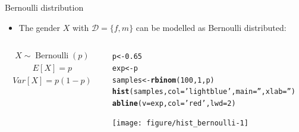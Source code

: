 \documentclass{beamer}\usepackage[]{graphicx}\usepackage[]{color}
\makeatletter
\newcommand{\hlnum}[1]{\textcolor[rgb]{0.686,0.059,0.569}{#1}}%
\newcommand{\hlstr}[1]{\textcolor[rgb]{0.192,0.494,0.8}{#1}}%
\newcommand{\hlstd}[1]{\textcolor[rgb]{0.345,0.345,0.345}{#1}}%
\newcommand{\hlkwb}[1]{\textcolor[rgb]{0.69,0.353,0.396}{#1}}%
\newcommand{\hlkwc}[1]{\textcolor[rgb]{0.333,0.667,0.333}{#1}}%
\newcommand{\hlkwd}[1]{\textcolor[rgb]{0.737,0.353,0.396}{\textbf{#1}}}%
\newenvironment{kframe}{%
 \def\at@end@of@kframe{}%
 \ifinner\ifhmode%
  \def\at@end@of@kframe{\end{minipage}}%
  \begin{minipage}{\columnwidth}%
 \fi\fi%
 \def\FrameCommand##1{\hskip\@totalleftmargin \hskip-\fboxsep
 \colorbox{shadecolor}{##1}\hskip-\fboxsep
     \hskip-\linewidth \hskip-\@totalleftmargin \hskip\columnwidth}%
 \MakeFramed {\advance\hsize-\width
   \@totalleftmargin\z@ \linewidth\hsize
   \@setminipage}}%
 {\par\unskip\endMakeFramed%
 \at@end@of@kframe}
\newenvironment{knitrout}{}{} %
\makeatother
\begin{document}
\begin{frame}[fragile]{Bernoulli distribution}
  \begin{itemize}
    \item The gender $X$ with $\mathcal{D}=\{f, m\}$ can be modelled as
      Bernoulli distributed:
  \end{itemize}
  \begin{columns}
    \begin{column}{.5\linewidth}
      \begin{align*}
        X \sim \operatorname{Bernoulli}(p)
      \end{align*}
      \begin{align*}
        E[X] = p
      \end{align*}
      \begin{align*}
        Var[X] = p(1-p)
      \end{align*}
    \end{column}
    \begin{column}{0.5\linewidth}
\begin{knitrout}\tiny
{}\color{fgcolor}\begin{kframe}
\begin{alltt}
\hlstd{p} \hlkwb{<-} \hlnum{0.65}
\hlstd{exp} \hlkwb{<-} \hlstd{p}
\hlstd{samples} \hlkwb{<-} \hlkwd{rbinom}\hlstd{(}\hlnum{100}\hlstd{,} \hlnum{1}\hlstd{, p)}
\hlkwd{hist}\hlstd{(samples,} \hlkwc{col}\hlstd{=}\hlstr{'lightblue'}\hlstd{,} \hlkwc{main}\hlstd{=}\hlstr{''}\hlstd{,} \hlkwc{xlab}\hlstd{=}\hlstr{''}\hlstd{)}
\hlkwd{abline}\hlstd{(}\hlkwc{v}\hlstd{=exp,} \hlkwc{col}\hlstd{=}\hlstr{'red'}\hlstd{,} \hlkwc{lwd}\hlstd{=}\hlnum{2}\hlstd{)}
\end{alltt}
\end{kframe}

{\centering \texttt{[image: figure/hist\_bernoulli-1]} 

}



\end{knitrout}
    \end{column}
  \end{columns}
\end{frame}
\end{document}
